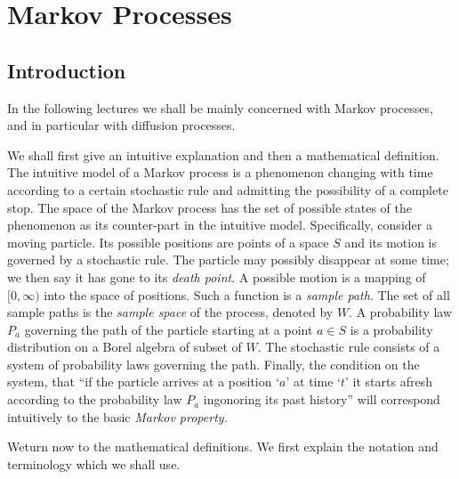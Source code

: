 \chapter{Markov Processes} %

\section{Introduction}\label{chap1-sec1} 
\pageoriginale 

In the following lectures we shall be mainly concerned with Markov
processes, and in particular with diffusion processes.  

We shall first give an intuitive explanation and then a mathematical
definition. The intuitive model of a Markov process is a phenomenon
changing with time according to a certain stochastic rule and
admitting the possibility of a complete stop. The space of the Markov
process has the set of possible states of the phenomenon as its
counter-part in the intuitive model. Specifically, consider a moving
particle. Its possible positions are points of a space $S$ and its
motion is governed by a stochastic rule. The particle may possibly
disappear at some time; we then say it has gone to its \textit{death
  point}. A possible motion is a mapping of $[ 0, \infty) $ into the
  space of positions. Such a function is a \textit{sample path}. The
  set of all sample paths is the \textit{sample space} of the
  process, denoted by $W$. A probability law $P_a$ governing the path
  of the particle starting at a point $a \in S$ is a probability
  distribution on a Borel algebra of subset of $W$. The stochastic
  rule consists of a system of probability laws governing the
  path. Finally, the condition on the system, that ``if the particle
  arrives at a position `$a$' at time `$t$' it starts afresh according
  to the probability law $P_a$ ingonoring its past history'' will
  correspond intuitively to the basic \textit{Markov property.} 

\begin{defins*}
We\pageoriginale turn now to the mathematical definitions. We first explain the
  notation and terminology which we shall use.  
\end{defins*}

